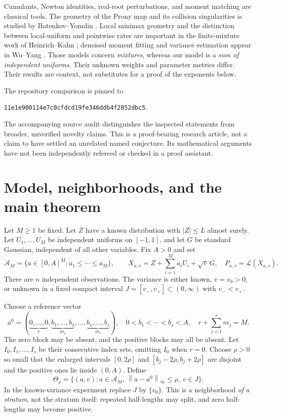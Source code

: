 \documentclass[11pt,a4paper]{article}
\numberwithin{equation}{section}
\theoremstyle{definition}
\theoremstyle{remark}
\newcommand{\Law}{\mathcal L}
\newcommand{\norm}[1]{\left\lVert#1\right\rVert}
\newcommand{\A}{\mathcal A_M}
\begin{document}
Cumulants, Newton identities, real-root perturbations, and moment matching
are classical tools. The geometry of the Prony map and its collision
singularities is studied by Batenkov--Yomdin \cite{BY}. Local minimax geometry
and the distinction between local-uniform and pointwise rates are important
in the finite-mixture work of Heinrich--Kahn \cite{HK}; denoised moment fitting
and variance estimation appear in Wu--Yang \cite{WY}. Those models concern
\emph{mixtures}, whereas our model is a \emph{sum of independent uniforms}.
Their unknown weights and parameter metrics differ. Their results are context,
not substitutes for a proof of the exponents below.

The repository comparison is pinned to
\begin{center}
\small\texttt{11e1e900114e7c0cfdcd19fe346ddb4f2852dbc5}.
\end{center}
The accompanying source audit distinguishes the inspected statements from
broader, unverified novelty claims. This is a proof-bearing research article,
not a claim to have settled an unrelated named conjecture. Its mathematical
arguments have not been independently refereed or checked in a proof assistant.

\section{Model, neighborhoods, and the main theorem}
\label{sec:main}

Let $M\ge1$ be fixed. Let $Z$ have a known distribution with $|Z|\le L$ almost
surely. Let $U_1,\ldots,U_M$ be independent uniforms on $[-1,1]$, and let $G$
be standard Gaussian, independent of all other variables. Fix $A>0$ and set
\begin{equation}
 \A=\{a\in[0,A]^M:a_1\le\cdots\le a_M\},\qquad
 X_{a,v}=Z+\sum_{i=1}^M a_iU_i+\sqrt v\,G,
 \quad P_{a,v}=\Law(X_{a,v}).
 \label{eq:model}
\end{equation}
There are $n$ independent observations. The variance is either known,
$v=v_0>0$, or unknown in a fixed compact interval
$J=[v_-,v_+]\subset(0,\infty)$ with $v_-<v_+$.

Choose a reference vector
\begin{equation}
 a^0=(\underbrace{0,\ldots,0}_{r},
 \underbrace{b_1,\ldots,b_1}_{m_1},\ldots,
 \underbrace{b_s,\ldots,b_s}_{m_s}),
 \quad 0<b_1<\cdots<b_s<A,
 \quad r+\sum_{j=1}^s m_j=M.
 \label{eq:base}
\end{equation}
The zero block may be absent, and the positive blocks may all be absent.
Let $I_0,I_1,\ldots,I_s$ be their consecutive index sets, omitting $I_0$
when $r=0$. Choose $\rho>0$ so small that the enlarged intervals
$[0,2\rho]$ and $[b_j-2\rho,b_j+2\rho]$ are disjoint and the positive ones
lie inside $(0,A)$. Define
\begin{equation}
 \Theta_\rho=\{(a,v):a\in\A,\ \norm{a-a^0}_\infty\le\rho,\ v\in J\}.
 \label{eq:neighborhood}
\end{equation}
In the known-variance experiment replace $J$ by $\{v_0\}$.
This is a neighborhood \emph{of a stratum}, not the stratum itself: repeated
half-lengths may split, and zero half-lengths may become positive.
\end{document}
